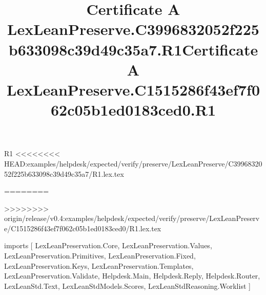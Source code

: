 \begin{lexlean}{R1}
<<<<<<<< HEAD:examples/helpdesk/expected/verify/preserve/LexLeanPreserve/C3996832052f225b633098c39d49c35a7/R1.lex.tex
\title{Certificate A LexLeanPreserve.C3996832052f225b633098c39d49c35a7.R1}
========
\title{Certificate A LexLeanPreserve.C1515286f43ef7f062c05b1ed0183ced0.R1}
>>>>>>>> origin/release/v0.4:examples/helpdesk/expected/verify/preserve/LexLeanPreserve/C1515286f43ef7f062c05b1ed0183ced0/R1.lex.tex
\begin{coremodule}
imports [
  LexLeanPreservation.Core,
  LexLeanPreservation.Values,
  LexLeanPreservation.Primitives,
  LexLeanPreservation.Fixed,
  LexLeanPreservation.Keys,
  LexLeanPreservation.Templates,
  LexLeanPreservation.Validate,
  Helpdesk.Main,
  Helpdesk.Reply,
  Helpdesk.Router,
  LexLeanStd.Text,
  LexLeanStdModels.Scores,
  LexLeanStdReasoning.Worklist
]


\end{coremodule}
\end{lexlean}
